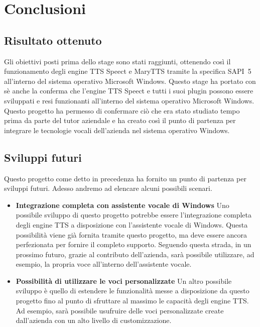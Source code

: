 \chapter{Conclusioni}
\thispagestyle{empty}

\newpage

\section{Risultato ottenuto}
Gli obiettivi posti prima dello stage sono stati raggiunti, ottenendo così il funzionamento degli engine TTS Speect e MaryTTS tramite la specifica SAPI~5 all'interno del sistema operativo Microsoft Windows.
Questo stage ha portato con sè anche la conferma che l'engine TTS Speect e tutti i suoi plugin possono essere sviluppati e resi funzionanti all'interno del sistema operativo Microsoft Windows.
Questo progetto ha permesso di confermare ciò che era stato studiato tempo prima da parte del tutor aziendale e ha creato così il punto di partenza per integrare le tecnologie vocali dell'azienda nel sistema operativo Windows.

\section{Sviluppi futuri}
Questo progetto come detto in precedenza ha fornito un punto di partenza per sviluppi futuri.
Adesso andremo ad elencare alcuni possibili scenari.
\begin{itemize}
	\item \textbf{Integrazione completa con assistente vocale di Windows} Uno possibile sviluppo di questo progetto potrebbe essere l'integrazione completa degli engine TTS a disposizione con l'assistente vocale di Windows. Questa possibilità viene già fornita tramite questo progetto, ma deve essere ancora perfezionata per fornire il completo supporto.
	Seguendo questa strada, in un prossimo futuro, grazie al contributo dell'azienda, sarà possibile utilizzare, ad esempio, la propria voce all'interno dell'assistente vocale.
	\item \textbf{Possibilità di utilizzare le voci personalizzate} Un altro possibile sviluppo è quello di estendere le funzionalità messe a disposizione da questo progetto fino al punto di sfruttare al massimo le capacità degli engine TTS.
	Ad esempio, sarà possibile usufruire delle voci personalizzate create dall'azienda con un alto livello di customizzazione.
\end{itemize}


